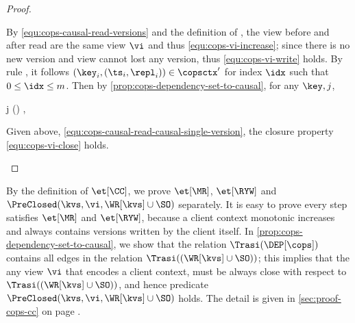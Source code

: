 \begin{proof}
\begin{enumerate}
\begin{enumerate}
\begin{Formulae}
\begin{Formula}
        \label{equ:cops-causal-read-versions}
        \end{Formula}
        \end{Formulae}
        By \cref{equ:cops-causal-read-versions} and the definition of \COPSViews, 
        the view before and after read are the same view \( \vi \) and thus \cref{equ:cops-vi-increase};
        since there is no new version and view cannot lost any version, thus \cref{equ:cops-vi-write} holds.
        By rule \rCOPSFinishRead, it follows \((\key_i,(\ts_i,\repl_i)) \in \copsctx' \) for index \( \idx \)
        such that \( 0 \leq \idx \leq m \).
        Then by \cref{prop:cops-dependency-set-to-causal}, for any \( \key, j \),
        \begin{Formulae}
        \begin{Formula}
         \implies j \in \vi(\key) ,
        \label{equ:cops-causal-read-causal-single-version}
        \end{Formula}
        \end{Formulae}
        Given above, \cref{equ:cops-causal-read-causal-single-version},
        the closure property \cref{equ:cops-vi-close} holds. \qedhere
    \end{enumerate}
\end{enumerate}
\end{proof}
\begin{proofsketch}
By the definition of \( \et[\CC] \), 
we prove \( \et[\MR] \), \( \et[\RYW] \) and  \( \PreClosed(\kvs,\vi,\WR[\kvs] \cup \SO ) \) separately.
It is easy to prove every step satisfies \( \et[\MR] \) and \( \et[\RYW] \),
because a client context monotonic increases and always contains versions written by the client itself.
In \cref{prop:cops-dependency-set-to-causal}, we show that 
the relation \( \Trasi(\DEP[\cops]) \) contains all edges in the relation \( \Trasi((\WR[\kvs] \cup \SO ))\);
this implies that the any view \( \vi \) that encodes a client context, 
must be always close with respect to \( \Trasi((\WR[\kvs] \cup \SO ))\),
and hence predicate \( \PreClosed(\kvs,\vi,\WR[\kvs] \cup \SO ) \) holds.
The detail is given in \cref{sec:proof-cops-cc} on page \pageref{sec:proof-cops-cc}.
\end{proofsketch}

